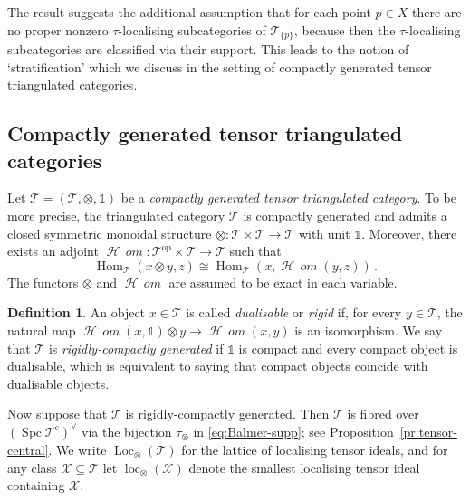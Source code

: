 \documentclass{amsart}[a4]
\theoremstyle{definition}
\newtheorem{definition}[theorem]{Definition}
\theoremstyle{remark}
\numberwithin{equation}{section}
\newcommand{\Hom}{\operatorname{Hom}}
\newcommand{\fHom}{\operatorname{\mathcal{H}\!\!\;\mathit{om}}}
\newcommand{\loc}{\operatorname{loc}}
\newcommand{\Loc}{\operatorname{Loc}}
\newcommand{\Spc}{\operatorname{Spc}}
\newcommand{\op}{\mathrm{op}}
\newcommand{\cat}{\mathcal}
\newcommand{\one}{\mathds 1}
\begin{document}
The result suggests the additional assumption that for each point
$p\in X$ there are no proper nonzero $\tau$-localising subcategories
of $\cat T_{\{p\}}$, because then the $\tau$-localising subcategories
are classified via their support. This leads to the notion of
`stratification' which we discuss in the setting of compactly
generated tensor triangulated categories.


\subsection*{Compactly generated tensor triangulated categories}

Let $\cat T= (\cat T,\otimes,\one)$ be a \emph{compactly generated
  tensor triangulated category}. To be more precise, the triangulated
category $\cat T$ is compactly generated and admits a closed symmetric
monoidal structure $\otimes\colon\cat T\times\cat T\to\cat T$ with
unit $\one$. Moreover, there exists an adjoint
$\fHom\colon \cat T^\op\times\cat T\to \cat T$ such that
\[\Hom_\cat T(x\otimes y,z)\cong\Hom_\cat T(x,\fHom(y,z))\,.\]
The functors $\otimes$ and $\fHom$ are assumed to be exact in each
variable.

\begin{definition}
An object $x\in\cat T$ is called \emph{dualisable} or \emph{rigid} if,
for every $y\in\cat T$, the natural map
$\fHom(x,\one) \otimes y\to \fHom(x,y)$ is an isomorphism.  We say that
$\cat T$ is \emph{rigidly-compactly generated} if $\one$ is compact
and every compact object is dualisable, which is equivalent to saying
that compact objects coincide with dualisable objects.
\end{definition}

Now suppose that $\cat T$ is rigidly-compactly generated.  Then
$\cat T$ is fibred over $(\Spc\cat T^{\mathrm c})^\vee$ via the bijection
$\tau_\otimes$ in \eqref{eq:Balmer-supp}; see Proposition~\ref{pr:tensor-central}.  We write
$\Loc_\otimes(\cat T)$ for the lattice of localising tensor ideals,
and for any class $\cat X\subseteq \cat T$ let $\loc_\otimes(\cat X)$
denote the smallest localising tensor ideal containing $\cat X$.
\end{document}
